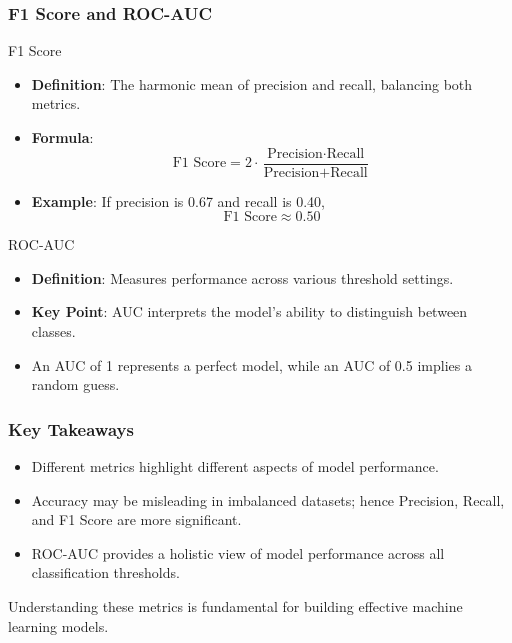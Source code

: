 \documentclass[aspectratio=169]{beamer}
\begin{document}
\begin{frame}[fragile]
    \frametitle{F1 Score and ROC-AUC}
    \begin{block}{F1 Score}
        \begin{itemize}
            \item \textbf{Definition}: The harmonic mean of precision and recall, balancing both metrics.
            \item \textbf{Formula}:
            \begin{equation}
                \text{F1 Score} = 2 \cdot \frac{\text{Precision} \cdot \text{Recall}}{\text{Precision} + \text{Recall}}
            \end{equation}
            \item \textbf{Example}: If precision is 0.67 and recall is 0.40,
            \[
            \text{F1 Score} \approx 0.50
            \]
        \end{itemize}
    \end{block}

    \begin{block}{ROC-AUC}
        \begin{itemize}
            \item \textbf{Definition}: Measures performance across various threshold settings.
            \item \textbf{Key Point}: AUC interprets the model's ability to distinguish between classes.
            \item An AUC of 1 represents a perfect model, while an AUC of 0.5 implies a random guess.
        \end{itemize}
    \end{block}
\end{frame}

\begin{frame}[fragile]
    \frametitle{Key Takeaways}
    \begin{itemize}
        \item Different metrics highlight different aspects of model performance.
        \item Accuracy may be misleading in imbalanced datasets; hence Precision, Recall, and F1 Score are more significant.
        \item ROC-AUC provides a holistic view of model performance across all classification thresholds.
    \end{itemize}
    
    Understanding these metrics is fundamental for building effective machine learning models. 
\end{frame}
\end{document}
